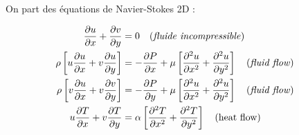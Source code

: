 On part des équations de Navier-Stokes 2D :

\begin{align}
  \pdv{u}{x} + \pdv{v}{y} &= 0 \qq{(\textit{fluide incompressible})} \\
  \rho \left[ u \pdv{u}{x} + v \pdv{u}{y} \right] &= - \pdv{P}{x} + \mu \left[ \pdv[2]{u}{x} + \pdv[2]{u}{y} \right] \qq{(\textit{fluid flow})} \\
  \rho \left[ v \pdv{u}{x} + v \pdv{v}{y} \right] &= - \pdv{P}{y} + \mu \left[ \pdv[2]{u}{x} + \pdv[2]{u}{y} \right] \qq{(\textit{fluid flow})} \\
  u \pdv{T}{x} + v \pdv{T}{y} &= \alpha \left[\pdv[2]{T}{x} + \pdv[2]{T}{y} \right] \qq{(heat flow)}
\end{align}